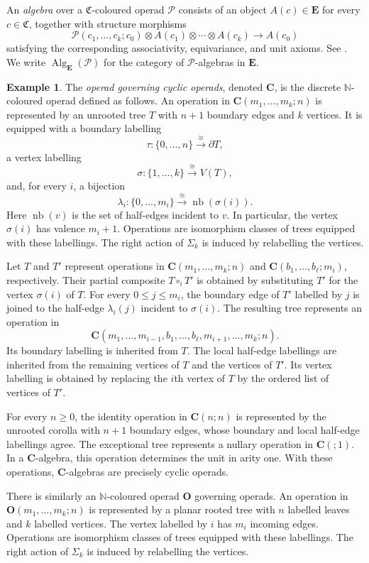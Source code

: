 \documentclass{amsart}
\newcommand{\bE}{\mathbf{E}}
\newcommand{\Alg}{\operatorname{Alg}}
\theoremstyle{definition}
\newtheorem{example}[theorem]{Example}%
\numberwithin{equation}{section}
\begin{document}
An \emph{algebra} over a $\mathfrak C$-coloured operad $\mathcal P$
consists of an object $A(c)\in\bE$ for every $c\in\mathfrak C$,
together with structure morphisms
\[
\mathcal P(c_1,\ldots,c_k;c_0)\otimes
A(c_1)\otimes\cdots\otimes A(c_k)
\longrightarrow A(c_0)
\]
satisfying the corresponding associativity, equivariance, and unit
axioms. See \cite[Definition~1.2]{bm_resolutions}. We write
$\Alg_{\bE}(\mathcal P)$ for the category of $\mathcal P$-algebras
in $\bE$.
\begin{example}
\label{ex: operad for cyclic operads}
The \emph{operad governing cyclic operads}, denoted $\mathbf C$, is
the discrete $\mathbb N$-coloured operad defined as follows. An
operation in $\mathbf C(m_1,\ldots,m_k;n)$ is represented by an
unrooted tree $T$ with $n+1$ boundary edges and $k$ vertices. It is
equipped with a boundary labelling
\[
\tau\colon\{0,\ldots,n\}\xrightarrow{\cong}\partial T,
\]
a vertex labelling
\[
\sigma\colon\{1,\ldots,k\}\xrightarrow{\cong}V(T),
\]
and, for every $i$, a bijection
\[
\lambda_i\colon
\{0,\ldots,m_i\}
\xrightarrow{\cong}
\operatorname{nb}(\sigma(i)).
\]
Here $\operatorname{nb}(v)$ is the set of half-edges incident to
$v$. In particular, the vertex $\sigma(i)$ has valence $m_i+1$.
Operations are isomorphism classes of trees equipped with these
labellings. The right action of $\Sigma_k$ is induced by relabelling
the vertices.

Let $T$ and $T'$ represent operations in
$\mathbf C(m_1,\ldots,m_k;n)$ and
$\mathbf C(b_1,\ldots,b_\ell;m_i)$, respectively. Their partial
composite $T\circ_iT'$ is obtained by substituting $T'$ for the
vertex $\sigma(i)$ of $T$. For every $0\leq j\leq m_i$, the boundary
edge of $T'$ labelled by $j$ is joined to the half-edge
$\lambda_i(j)$ incident to $\sigma(i)$. The resulting tree represents
an operation in
\[
\mathbf C
(m_1,\ldots,m_{i-1},b_1,\ldots,b_\ell,
m_{i+1},\ldots,m_k;n).
\]
Its boundary labelling is inherited from $T$. The local half-edge
labellings are inherited from the remaining vertices of $T$ and the
vertices of $T'$. Its vertex labelling is obtained by replacing the
$i$th vertex of $T$ by the ordered list of vertices of $T'$.

For every $n\geq0$, the identity operation in $\mathbf C(n;n)$ is
represented by the unrooted corolla with $n+1$ boundary edges, whose
boundary and local half-edge labellings agree. The exceptional tree
represents a nullary operation in $\mathbf C({};1)$. In a
$\mathbf C$-algebra, this operation determines the unit in arity
one. With these operations, $\mathbf C$-algebras are precisely cyclic
operads.
\end{example}
There is similarly an $\mathbb N$-coloured operad $\mathbf O$
governing operads. An operation in
$\mathbf O(m_1,\ldots,m_k;n)$ is represented by a planar rooted tree
with $n$ labelled leaves and $k$ labelled vertices. The vertex
labelled by $i$ has $m_i$ incoming edges. Operations are isomorphism
classes of trees equipped with these labellings. The right action of
$\Sigma_k$ is induced by relabelling the vertices.
\end{document}
